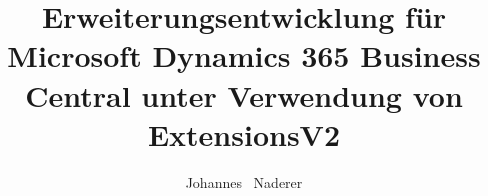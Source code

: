 \documentclass[bachelor,german]{hgbthesis}
\title{	Erweiterungsentwicklung für Microsoft Dynamics 365 Business Central unter Verwendung von ExtensionsV2}
\author{Johannes \ Naderer}
\begin{document}


	
	
\frontmatter                    %

\maketitle
\tableofcontents

\mainmatter          %









\MakeBibliography                        %

\end{document}
